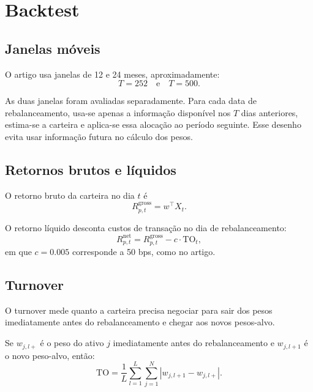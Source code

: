 \documentclass[12pt,a4paper]{article}
\begin{document}
\section{Backtest}

\subsection{Janelas móveis}

O artigo usa janelas de 12 e 24 meses, aproximadamente:
\begin{equation}
  T=252
  \quad \text{e} \quad
  T=500.
\end{equation}

As duas janelas foram avaliadas separadamente. Para cada data de rebalanceamento, usa-se
apenas a informação disponível nos $T$ dias anteriores, estima-se a carteira e aplica-se essa
alocação ao período seguinte. Esse desenho evita usar informação futura no cálculo dos pesos.

\subsection{Retornos brutos e líquidos}

O retorno bruto da carteira no dia $t$ é
\begin{equation}
  R_{p,t}^{\mathrm{gross}} = w^\top X_t.
\end{equation}

O retorno líquido desconta custos de transação no dia de rebalanceamento:
\begin{equation}
  R_{p,t}^{\mathrm{net}}
  =
  R_{p,t}^{\mathrm{gross}}
  -
  c \cdot \mathrm{TO}_t,
\end{equation}
em que $c=0.005$ corresponde a 50 bps, como no artigo.

\subsection{Turnover}

O turnover mede quanto a carteira precisa negociar para sair dos pesos imediatamente antes
do rebalanceamento e chegar aos novos pesos-alvo.

Se $w_{j,l+}$ é o peso do ativo $j$ imediatamente antes do rebalanceamento e $w_{j,l+1}$ é
o novo peso-alvo, então:
\begin{equation}
  \mathrm{TO}
  =
  \frac{1}{L}
  \sum_{l=1}^{L}
  \sum_{j=1}^{N}
  |w_{j,l+1} - w_{j,l+}|.
\end{equation}
\end{document}
